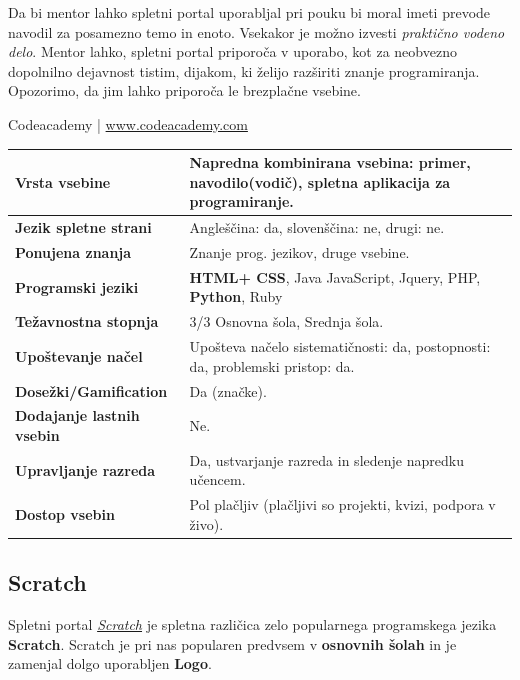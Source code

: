 Da bi mentor lahko spletni portal uporabljal pri pouku bi moral imeti
prevode navodil za posamezno temo in enoto. Vsekakor je možno izvesti
\emph{praktično vodeno delo}. Mentor lahko, spletni portal priporoča v
uporabo, kot za neobvezno dopolnilno dejavnost tistim, dijakom, ki
želijo razširiti znanje programiranja. Opozorimo, da jim lahko
priporoča le brezplačne vsebine.


\begin{osebnabox}[label={osebna:codeacademy}]{Codeacademy | \url{www.codeacademy.com}}
    \begin{tabular}{
  p{} |
  p{}  }
  \textbf{Vrsta vsebine} & \textbf{Napredna kombinirana vsebina}: primer,
                           navodilo(vodič), spletna aplikacija za programiranje.  \\
      \hline
  \textbf{Jezik spletne strani} &  Angleščina: da, slovenščina: ne,
                                  drugi: ne. \\
      \hline
  \textbf{Ponujena znanja} & Znanje prog. jezikov, druge vsebine. \\
      \hline
 \textbf{Programski jeziki} & \textbf{HTML+ CSS}, Java JavaScript, Jquery, PHP,
                              \textbf{Python}, Ruby \\
      \hline
  \textbf{Težavnostna stopnja} & 3/3 Osnovna šola, Srednja šola. \\
      \hline
   \textbf{Upoštevanje načel} & Upošteva načelo sistematičnosti: da,
      postopnosti: da, problemski pristop: da. \\
      \hline
  \textbf{Dosežki/Gamification} & Da (značke). \\
      \hline
  \textbf{Dodajanje lastnih vsebin} & Ne. \\
      \hline
  \textbf{Upravljanje razreda} &Da, ustvarjanje razreda in sledenje
                                 napredku učencem. \\
      \hline
  \textbf{Dostop vsebin} & Pol plačljiv (plačljivi so projekti, kvizi,
                           podpora v živo). \\
\end{tabular}
\end{osebnabox}

\subsection{Scratch}
\label{sec:scratch}

Spletni portal \emph{\href{https://scratch.mit.edu/}{Scratch}}
\cite{web:scratch} je spletna različica zelo popularnega programskega
jezika \textbf{Scratch}. Scratch je pri nas popularen predvsem v
\textbf{osnovnih šolah} in je zamenjal dolgo uporabljen \textbf{Logo}.

